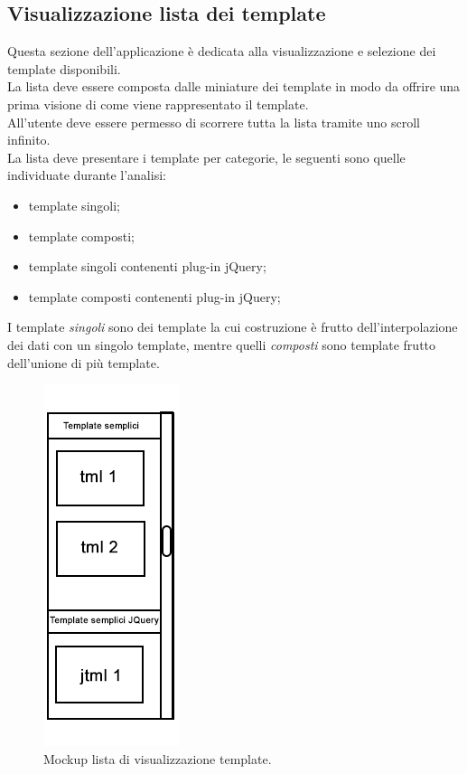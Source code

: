 \subsection{Visualizzazione lista dei template} \label{subsec:visualizzazione_template}
Questa sezione dell'applicazione è dedicata alla visualizzazione e selezione dei template disponibili.\\
La lista deve essere composta dalle miniature dei template in modo da offrire una prima visione di come viene rappresentato il template.\\
All'utente deve essere permesso di scorrere tutta la lista tramite uno scroll infinito.\\
La lista deve presentare i template per categorie, le seguenti sono quelle individuate durante l'analisi:
\begin{itemize}
	\item template singoli;
	\item template composti;
	\item template singoli contenenti plug-in jQuery;
	\item template composti contenenti plug-in jQuery;
\end{itemize}
I template \textit{singoli} sono dei template la cui costruzione è frutto dell'interpolazione dei dati con un singolo template, mentre quelli \textit{composti} sono template frutto dell'unione di più template.\\
\begin{figure}[htp]
	\centering
	\includegraphics[scale=0.5]{../immagini/mockup_lista}
	\caption{Mockup lista di visualizzazione template.}
\end{figure}

